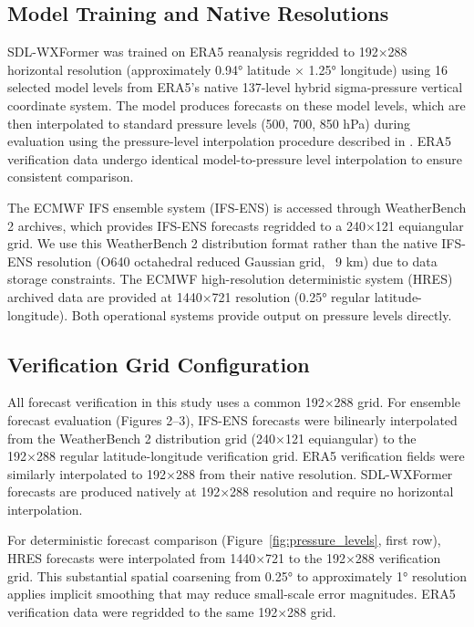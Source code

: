 \documentclass{agujournal2019}
\begin{document}
\subsection{Model Training and Native Resolutions}

SDL-WXFormer was trained on ERA5 reanalysis regridded to 192×288 horizontal resolution (approximately 0.94° latitude × 1.25° longitude) using 16 selected model levels from ERA5's native 137-level hybrid sigma-pressure vertical coordinate system. The model produces forecasts on these model levels, which are then interpolated to standard pressure levels (500, 700, 850 hPa) during evaluation using the pressure-level interpolation procedure described in \cite{schreck2025}. ERA5 verification data undergo identical model-to-pressure level interpolation to ensure consistent comparison.

The ECMWF IFS ensemble system (IFS-ENS) is accessed through WeatherBench 2 archives, which provides IFS-ENS forecasts regridded to a 240×121 equiangular grid. We use this WeatherBench 2 distribution format rather than the native IFS-ENS resolution (O640 octahedral reduced Gaussian grid, ~9 km) due to data storage constraints. The ECMWF high-resolution deterministic system (HRES) archived data are provided at 1440×721 resolution (0.25° regular latitude-longitude). Both operational systems provide output on pressure levels directly.

\subsection{Verification Grid Configuration}

All forecast verification in this study uses a common 192×288 grid. For ensemble forecast evaluation (Figures 2–3), IFS-ENS forecasts were bilinearly interpolated from the WeatherBench 2 distribution grid (240×121 equiangular) to the 192×288 regular latitude-longitude verification grid. ERA5 verification fields were similarly interpolated to 192×288 from their native resolution. SDL-WXFormer forecasts are produced natively at 192×288 resolution and require no horizontal interpolation.

For deterministic forecast comparison (Figure~\ref{fig:pressure_levels}, first row), HRES forecasts were interpolated from 1440×721 to the 192×288 verification grid. This substantial spatial coarsening from 0.25° to approximately 1° resolution applies implicit smoothing that may reduce small-scale error magnitudes. ERA5 verification data were regridded to the same 192×288 grid.
\end{document}
